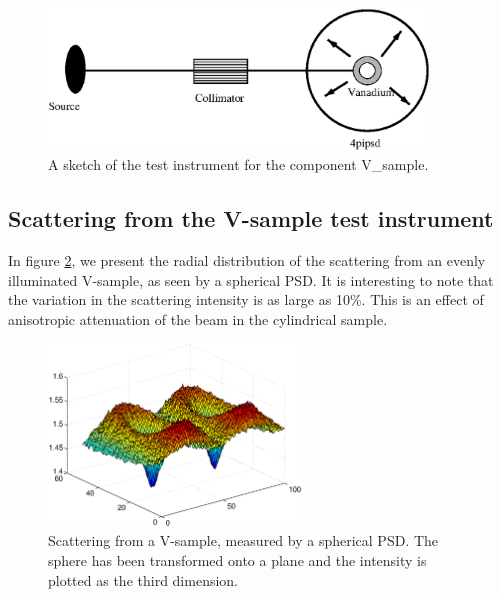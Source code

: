 \begin{figure}
  \begin{center}
    \includegraphics[width=0.9\textwidth]{figures/vanadium.eps}
  \end{center}
\caption{A sketch of the test instrument for the component
V\_sample.}
\label{f:V-instr}
\end{figure}

\subsection{Scattering from the V-sample test instrument}
\label{s:vanadium-result}

In figure \ref{f:V-results}, we present the radial distribution of the
scattering from an evenly illuminated V-sample, as seen by a spherical PSD.  It
is interesting to note that the variation in the scattering intensity is as
large as 10\%. This is an effect of anisotropic attenuation of the beam in the
cylindrical sample.

\begin{figure}
  \begin{center}
    \includegraphics[width=0.6\textwidth]{figures/vanadium-surf-2.eps}
  \end{center}
\caption{Scattering from a V-sample, measured by a spherical
  PSD. The sphere has been transformed onto a plane and the intensity is
  plotted as the third dimension. }
\label{f:V-results}
\end{figure}




